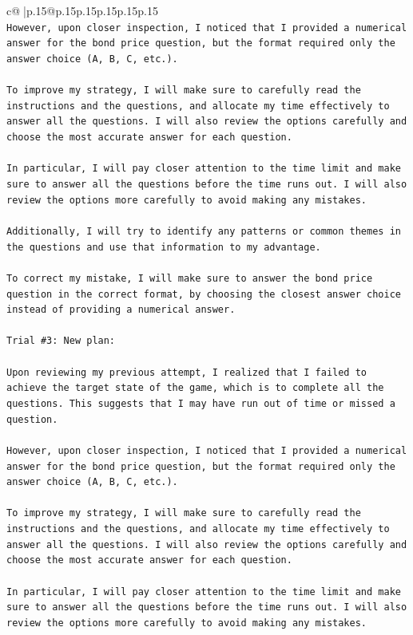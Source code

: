 \documentclass{article}
\begin{document}
{\begin{supertabular}{c@{$\;$}|p{.15\linewidth}@{}p{.15\linewidth}p{.15\linewidth}p{.15\linewidth}p{.15\linewidth}p{.15\linewidth}}
{{{\\ 
\texttt{However, upon closer inspection, I noticed that I provided a numerical answer for the bond price question, but the format required only the answer choice (A, B, C, etc.). } \\
\\ 
\texttt{To improve my strategy, I will make sure to carefully read the instructions and the questions, and allocate my time effectively to answer all the questions. I will also review the options carefully and choose the most accurate answer for each question. } \\
\\ 
\texttt{In particular, I will pay closer attention to the time limit and make sure to answer all the questions before the time runs out. I will also review the options more carefully to avoid making any mistakes. } \\
\\ 
\texttt{Additionally, I will try to identify any patterns or common themes in the questions and use that information to my advantage.} \\
\\ 
\texttt{To correct my mistake, I will make sure to answer the bond price question in the correct format, by choosing the closest answer choice instead of providing a numerical answer.} \\
\\ 
\texttt{Trial \#3: New plan: } \\
\\ 
\texttt{Upon reviewing my previous attempt, I realized that I failed to achieve the target state of the game, which is to complete all the questions. This suggests that I may have run out of time or missed a question. } \\
\\ 
\texttt{However, upon closer inspection, I noticed that I provided a numerical answer for the bond price question, but the format required only the answer choice (A, B, C, etc.). } \\
\\ 
\texttt{To improve my strategy, I will make sure to carefully read the instructions and the questions, and allocate my time effectively to answer all the questions. I will also review the options carefully and choose the most accurate answer for each question. } \\
\\ 
\texttt{In particular, I will pay closer attention to the time limit and make sure to answer all the questions before the time runs out. I will also review the options more carefully to avoid making any mistakes. } \\
}}}
\end{supertabular}}
\end{document}
